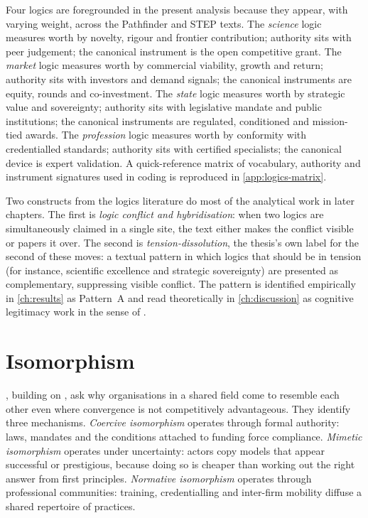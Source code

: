 Four logics are foregrounded in the present analysis because they
appear, with varying weight, across the Pathfinder and STEP texts.
The \emph{science} logic measures worth by novelty, rigour and frontier
contribution; authority sits with peer judgement; the canonical
instrument is the open competitive grant. The \emph{market} logic
measures worth by commercial viability, growth and return; authority
sits with investors and demand signals; the canonical instruments are
equity, rounds and co-investment. The \emph{state} logic measures
worth by strategic value and sovereignty; authority sits with
legislative mandate and public institutions; the canonical instruments
are regulated, conditioned and mission-tied awards. The
\emph{profession} logic measures worth by conformity with credentialled
standards; authority sits with certified specialists; the canonical
device is expert validation. A quick-reference matrix of vocabulary,
authority and instrument signatures used in coding is reproduced in
\cref{app:logics-matrix}.

Two constructs from the logics literature do most of the analytical
work in later chapters. The first is \emph{logic conflict and
hybridisation}: when two logics are simultaneously claimed in a single
site, the text either makes the conflict visible or papers it over.
The second is \emph{tension-dissolution}, the thesis's own label for
the second of these moves: a textual pattern in which logics that
should be in tension (for instance, scientific excellence and
strategic sovereignty) are presented as complementary, suppressing
visible conflict. The pattern is identified empirically in
\cref{ch:results} as Pattern~A and read theoretically in
\cref{ch:discussion} as cognitive legitimacy work in the sense of
\textcite{suchman1995managing}.

\section{Isomorphism}
\label{sec:bg-it-isomorphism}

\textcite{dimaggio1983iron}, building on \textcite{meyer1977institutionalized},
ask why organisations in a shared field come to resemble each other
even where convergence is not competitively advantageous. They
identify three mechanisms. \emph{Coercive isomorphism} operates
through formal authority: laws, mandates and the conditions attached
to funding force compliance. \emph{Mimetic isomorphism} operates under
uncertainty: actors copy models that appear successful or prestigious,
because doing so is cheaper than working out the right answer from
first principles. \emph{Normative isomorphism} operates through
professional communities: training, credentialling and inter-firm
mobility diffuse a shared repertoire of practices.

